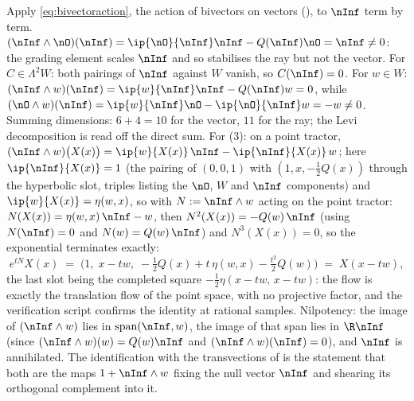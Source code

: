 Apply \eqref{eq:bivectoraction}, the action of bivectors on vectors (), to $\nInf$ term by term. $(\nInf \wedge \nO)(\nInf) = \ip{\nO}{\nInf}\nInf - Q(\nInf)\nO = \nInf \neq 0$: the grading element scales $\nInf$ and so stabilises the ray but not the vector. For $C \in \Lambda^2 W$: both pairings of $\nInf$ against $W$ vanish, so $C(\nInf) = 0$. For $w \in W$: $(\nInf \wedge w)(\nInf) = \ip{w}{\nInf}\nInf - Q(\nInf)w = 0$, while $(\nO \wedge w)(\nInf) = \ip{w}{\nInf}\nO - \ip{\nO}{\nInf}w = -w \neq 0$. Summing dimensions: $6 + 4 = 10$ for the vector, $11$ for the ray; the Levi decomposition is read off the direct sum. For (3): on a point tractor, $(\nInf \wedge w)\bigl(X(x)\bigr) = \ip{w}{X(x)}\,\nInf - \ip{\nInf}{X(x)}\,w$; here $\ip{\nInf}{X(x)} = 1$ (the pairing of $(0,0,1)$ with $(1, x, -\tfrac12 Q(x))$ through the hyperbolic slot, triples listing the $\nO$, $W$ and $\nInf$ components) and $\ip{w}{X(x)} = \eta(w, x)$, so with $N := \nInf \wedge w$ acting on the point tractor: $N(X(x)) = \eta(w, x)\,\nInf - w$, then $N^2(X(x)) = -Q(w)\,\nInf$ (using $N(\nInf) = 0$ and $N(w) = Q(w)\,\nInf$) and $N^3(X(x)) = 0$, so the exponential terminates exactly:
\[
e^{tN} X(x) \;=\; \bigl(1,\; x - tw,\; -\tfrac12Q(x) + t\,\eta(w,x) - \tfrac{t^2}{2}Q(w)\bigr) \;=\; X(x - tw),
\]
the last slot being the completed square $-\tfrac12\eta(x - tw,\, x - tw)$: the flow is exactly the translation flow of the point space, with no projective factor, and the verification script confirms the identity at rational samples. Nilpotency: the image of $(\nInf \wedge w)$ lies in $\operatorname{span}(\nInf, w)$, the image of that span lies in $\R \nInf$ (since $(\nInf\wedge w)(w) = Q(w)\nInf$ and $(\nInf\wedge w)(\nInf) = 0$), and $\nInf$ is annihilated. The identification with the transvections of \cite{ButlerT1} is the statement that both are the maps $1 + \nInf \wedge w$ fixing the null vector $\nInf$ and shearing its orthogonal complement into it.
